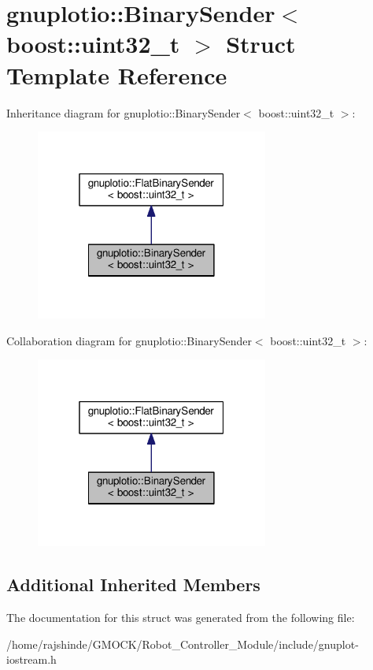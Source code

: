 \hypertarget{structgnuplotio_1_1_binary_sender_3_01boost_1_1uint32__t_01_4}{}\section{gnuplotio\+:\+:Binary\+Sender$<$ boost\+:\+:uint32\+\_\+t $>$ Struct Template Reference}
\label{structgnuplotio_1_1_binary_sender_3_01boost_1_1uint32__t_01_4}


Inheritance diagram for gnuplotio\+:\+:Binary\+Sender$<$ boost\+:\+:uint32\+\_\+t $>$\+:
\nopagebreak
\begin{figure}[H]
\begin{center}
\leavevmode
\includegraphics[width=217pt]{structgnuplotio_1_1_binary_sender_3_01boost_1_1uint32__t_01_4__inherit__graph}
\end{center}
\end{figure}


Collaboration diagram for gnuplotio\+:\+:Binary\+Sender$<$ boost\+:\+:uint32\+\_\+t $>$\+:
\nopagebreak
\begin{figure}[H]
\begin{center}
\leavevmode
\includegraphics[width=217pt]{structgnuplotio_1_1_binary_sender_3_01boost_1_1uint32__t_01_4__coll__graph}
\end{center}
\end{figure}
\subsection*{Additional Inherited Members}


The documentation for this struct was generated from the following file\+:\begin{DoxyCompactItemize}
\item 
/home/rajshinde/\+G\+M\+O\+C\+K/\+Robot\+\_\+\+Controller\+\_\+\+Module/include/gnuplot-\/iostream.\+h\end{DoxyCompactItemize}
